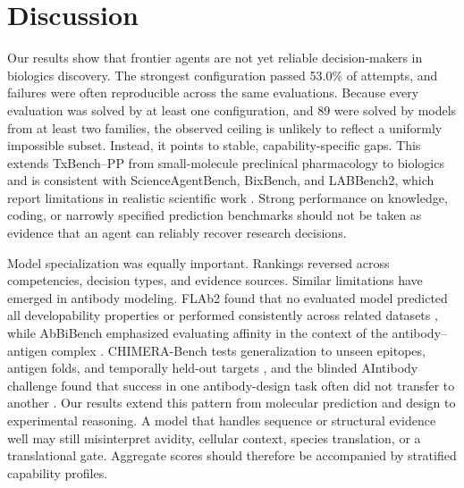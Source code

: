 \documentclass[10pt,letterpaper]{article}
\begin{document}
\section{Discussion}
Our results show that frontier agents are not yet reliable decision-makers in biologics discovery. The strongest configuration passed 53.0\% of attempts, and failures were often reproducible across the same evaluations. Because every evaluation was solved by at least one configuration, and 89 were solved by models from at least two families, the observed ceiling is unlikely to reflect a uniformly impossible subset. Instead, it points to stable, capability-specific gaps. This extends TxBench--PP from small-molecule preclinical pharmacology to biologics \cite{Le2026-tm} and is consistent with ScienceAgentBench, BixBench, and LABBench2, which report limitations in realistic scientific work \cite{Chen2024-ov, Laurent2026-zk, Mitchener2025-fo}. Strong performance on knowledge, coding, or narrowly specified prediction benchmarks should not be taken as evidence that an agent can reliably recover research decisions.
\par
Model specialization was equally important. Rankings reversed across competencies, decision types, and evidence sources. Similar limitations have emerged in antibody modeling. FLAb2 found that no evaluated model predicted all developability properties or performed consistently across related datasets \cite{Chungyoun2025-co}, while AbBiBench emphasized evaluating affinity in the context of the antibody–antigen complex \cite{Zhao2025-pb}. CHIMERA-Bench tests generalization to unseen epitopes, antigen folds, and temporally held-out targets \cite{Ahmed2026-uq}, and the blinded AIntibody challenge found that success in one antibody-design task often did not transfer to another \cite{Erasmus2026-qb}. Our results extend this pattern from molecular prediction and design to experimental reasoning. A model that handles sequence or structural evidence well may still misinterpret avidity, cellular context, species translation, or a translational gate. Aggregate scores should therefore be accompanied by stratified capability profiles.
\par
\end{document}
